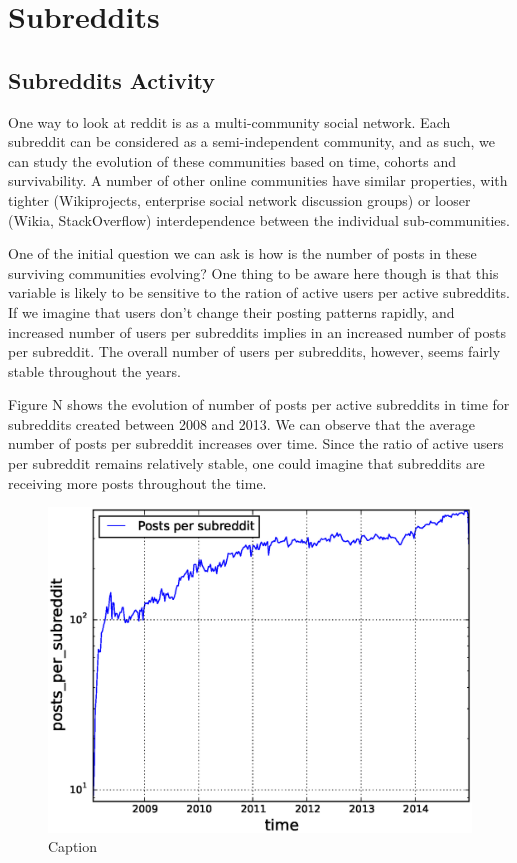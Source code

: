 \section{Subreddits}

\subsection{Subreddits Activity}

One way to look at reddit is as a multi-community social network. Each subreddit can be considered as a semi-independent community, and as such, we can study the evolution of these communities based on time, cohorts and survivability.  A number of other online communities have similar properties, with tighter (Wikiprojects, enterprise social network discussion groups) or looser (Wikia, StackOverflow) interdependence between the individual sub-communities.

One of the initial question we can ask is how is the number of posts in these surviving communities evolving? One thing to be aware here though is that this variable is likely to be sensitive to the ration of active users per active subreddits. If we imagine that users don't change their posting patterns rapidly, and increased number of users per subreddits implies in an increased number of posts per subreddit. The overall number of users per subreddits, however, seems fairly stable throughout the years.

Figure N shows the evolution of number of posts per active subreddits in time for subreddits created between 2008 and 2013. We can observe that the average number of posts per subreddit increases over time. Since the ratio of active users per subreddit remains relatively stable, one could imagine that subreddits are receiving more posts throughout the time.

\begin{figure}[!tb]
\centering
\includegraphics[scale=0.4]{./images/posts_per_subreddit_over_time_total.eps}
\caption{Caption}
\label{fig:posts_per_subreddit_over_time_total}
\end{figure}

